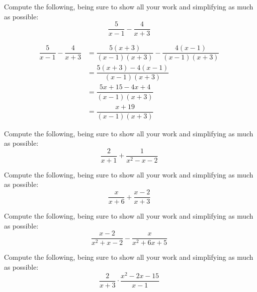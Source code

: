\documentclass[11pt,letterpaper]{article}
\begin{document}

 Compute the following, being sure to show all your work and simplifying as much as possible:
	\[
	\dfrac{5}{x - 1} - \dfrac{4}{x + 3}
	\] \pspace

\sol
	\[
	\begin{aligned}
	\dfrac{5}{x - 1} - \dfrac{4}{x + 3}&= \dfrac{5(x + 3)}{(x - 1)(x + 3)} - \dfrac{4(x - 1)}{(x - 1)(x + 3)} \\[0.3cm]
	&= \dfrac{5(x + 3) - 4(x - 1)}{(x - 1)(x + 3)} \\[0.3cm]
	&= \dfrac{5x + 15 - 4x + 4}{(x - 1)(x + 3)} \\[0.3cm]
	&= \dfrac{x + 19}{(x - 1)(x + 3)}
	\end{aligned}
	\]





\newpage





 Compute the following, being sure to show all your work and simplifying as much as possible:
	\[
	\dfrac{2}{x + 1} + \dfrac{1}{x^2 - x - 2}
	\] \pspace





\newpage





 Compute the following, being sure to show all your work and simplifying as much as possible:
	\[
	\dfrac{x}{x + 6} + \dfrac{x - 2}{x + 3}
	\] \pspace





\newpage





 Compute the following, being sure to show all your work and simplifying as much as possible:
	\[
	\dfrac{x - 2}{x^2 + x - 2} - \dfrac{x}{x^2 + 6x + 5}
	\] \pspace





\newpage





 Compute the following, being sure to show all your work and simplifying as much as possible:
	\[
	\dfrac{2}{x + 3} \cdot \dfrac{x^2 - 2x - 15}{x - 1}
	\] \pspace
\end{document}
